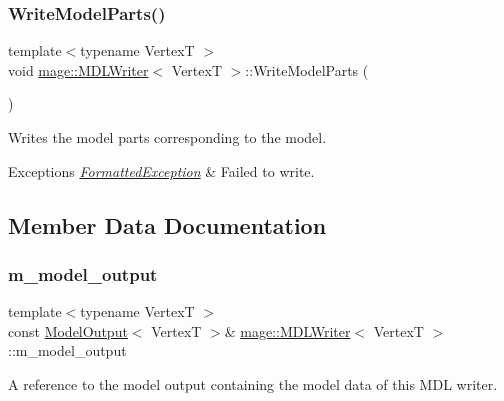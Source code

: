 \subsubsection{\texorpdfstring{Write\+Model\+Parts()}{WriteModelParts()}}
{\footnotesize\ttfamily template$<$typename VertexT $>$ \\
void \hyperlink{classmage_1_1_m_d_l_writer}{mage\+::\+M\+D\+L\+Writer}$<$ VertexT $>$\+::Write\+Model\+Parts (\begin{DoxyParamCaption}{ }\end{DoxyParamCaption})\hspace{0.3cm}{\ttfamily [private]}}

Writes the model parts corresponding to the model.


\begin{DoxyExceptions}{Exceptions}
{\em \hyperlink{classmage_1_1_formatted_exception}{Formatted\+Exception}} & Failed to write. \\
\hline
\end{DoxyExceptions}


\subsection{Member Data Documentation}
\hypertarget{classmage_1_1_m_d_l_writer_a607fc83a3dbab79f55c3eaca203c027b}{}\label{classmage_1_1_m_d_l_writer_a607fc83a3dbab79f55c3eaca203c027b} 
\subsubsection{\texorpdfstring{m\+\_\+model\+\_\+output}{m\_model\_output}}
{\footnotesize\ttfamily template$<$typename VertexT $>$ \\
const \hyperlink{structmage_1_1_model_output}{Model\+Output}$<$ VertexT $>$\& \hyperlink{classmage_1_1_m_d_l_writer}{mage\+::\+M\+D\+L\+Writer}$<$ VertexT $>$\+::m\+\_\+model\+\_\+output\hspace{0.3cm}{\ttfamily [private]}}

A reference to the model output containing the model data of this M\+DL writer. 